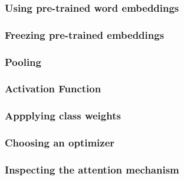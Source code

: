 \subsubsection{Using pre-trained word embeddings}
\label{subsubsec:5_experiments/4_texter/2_static/3_pre_trained}


\subsubsection{Freezing pre-trained embeddings}
\label{subsubsec:5_experiments/4_texter/2_static/4_update_vectors}


\subsubsection{Pooling}
\label{subsubsec:5_experiments/4_texter/2_static/5_pooling}


\subsubsection{Activation Function}
\label{subsubsec:5_experiments/4_texter/2_static/6_activation}


\subsubsection{Appplying class weights}
\label{subsubsec:5_experiments/4_texter/2_static/7_weight_factor}


\subsubsection{Choosing an optimizer}
\label{subsubsec:5_experiments/4_texter/2_static/8_optimizer}


\subsubsection{Inspecting the attention mechanism}
\label{subsubsec:5_experiments/4_texter/2_static/9_attention}


